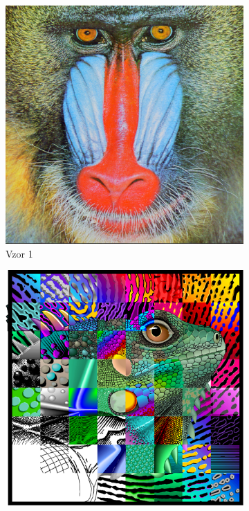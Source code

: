 \documentclass[a4paper,11pt]{scrartcl}
\begin{document}
\begin{figure}[!h]
    \centering
    \begin{subfigure}[b]{0.4\textwidth}
        \includegraphics[width=\textwidth]{img/example1.png}
        \caption{Vzor 1}
        \label{fig:gull}
    \end{subfigure}
    \begin{subfigure}[b]{0.4\textwidth}
        \includegraphics[width=\textwidth]{img/example2.png}

\end{subfigure}
\end{figure}
\end{document}
